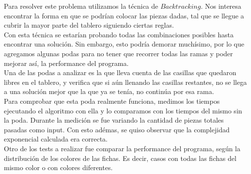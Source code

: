 \documentclass[11pt, a4paper, twoside]{article}
\begin{document}
Para resolver este problema utilizamos la técnica de $Backtracking$. Nos interesa encontrar la forma en que se podrían
colocar las piezas dadas, tal que se llegue a cubrir la mayor parte del tablero siguiendo ciertas reglas. \\
Con esta técnica se estarían probando todas las combinaciones posibles hasta encontrar una solución. Sin embargo, 
esto podría demorar muchísimo, por lo que agregamos algunas podas para no tener que recorrer todas las ramas 
y poder mejorar así, la performance del programa. \\
Una de las podas a analizar es la que lleva cuenta de las casillas que quedaron libres en el tablero, y verifica 
que si aún llenando las casillas restantes, no se llega a una solución mejor que la que ya se tenía, no continúa
por esa rama. \\
Para comprobar que esta poda realmente funciona, medimos los tiempos ejecutando el algoritmo con ella y lo 
comparamos con los tiempos del mismo sin la poda. Durante la medición se fue variando la cantidad de 
piezas totales pasadas como input. Con esto adémas, se quiso observar que la complejidad exponencial calculada era correcta.\\
Otro de los tests a realizar fue comparar la performance del programa, según la distribución de los colores de las
fichas. Es decir, casos con todas las fichas del mismo color o con colores diferentes. \\








\end{document}
